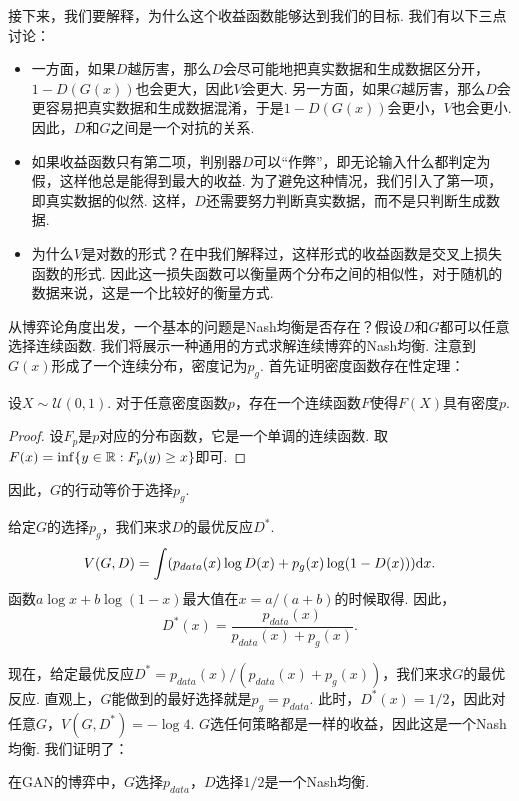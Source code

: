 接下来，我们要解释，为什么这个收益函数能够达到我们的目标. 我们有以下三点讨论：

\begin{itemize}
    \item 一方面，如果$D$越厉害，那么$D$会尽可能地把真实数据和生成数据区分开，$1-D(G(x))$也会更大，因此$V$会更大. 另一方面，如果$G$越厉害，那么$D$会更容易把真实数据和生成数据混淆，于是$1-D(G(x))$会更小，$V$也会更小. 因此，$D$和$G$之间是一个对抗的关系.
    
    \item 如果收益函数只有第二项，判别器$D$可以“作弊”，即无论输入什么都判定为假，这样他总是能得到最大的收益. 为了避免这种情况，我们引入了第一项，即真实数据的似然. 这样，$D$还需要努力判断真实数据，而不是只判断生成数据.
    
    \item 为什么$V$是对数的形式？在中我们解释过，这样形式的收益函数是交叉上损失函数的形式. 因此这一损失函数可以衡量两个分布之间的相似性，对于随机的数据来说，这是一个比较好的衡量方式.
\end{itemize}


从博弈论角度出发，一个基本的问题是Nash均衡是否存在？假设$D$和$G$都可以任意选择连续函数. 我们将展示一种通用的方式求解连续博弈的Nash均衡. 注意到$G(x)$形成了一个连续分布，密度记为$p_g$.  首先证明密度函数存在性定理：
\begin{theorem}
设$X\sim \mathcal U(0,1)$. 对于任意密度函数$p$，存在一个连续函数$F$使得$F(X)$具有密度$p$.
\end{theorem}
\begin{proof}
设$F_p$是$p$对应的分布函数，它是一个单调的连续函数. 取$F(x)=\inf\{y\in \mathbb{R}: F_p(y)\geq x\}$即可.
\end{proof}
因此，$G$的行动等价于选择$p_g$.

给定$G$的选择$p_g$，我们来求$D$的最优反应$D^*$.
    \[V(G,D)=\int (p_{data}(x)\log D(x)+p_g(x)\log(1-D(x)))\mathrm{d} x.\]
函数$a\log x+b\log(1-x)$最大值在$x=a/(a+b)$的时候取得. 因此，
    \[D^*(x)=\frac{p_{data}(x)}{p_{data}(x)+p_g(x)}.\]
    
现在，给定最优反应$D^*=p_{data}(x)/(p_{data}(x)+p_g(x))$，我们来求$G$的最优反应. 直观上，$G$能做到的最好选择就是$p_g=p_{data}$. 此时，$D^*(x)=1/2$，因此对任意$G$，$V(G,D^*)=-\log 4$. $G$选任何策略都是一样的收益，因此这是一个Nash均衡. 我们证明了：
\begin{theorem}[GAN的Nash均衡存在性]
在GAN的博弈中，$G$选择$p_{data}$，$D$选择$1/2$是一个Nash均衡.
\end{theorem}

